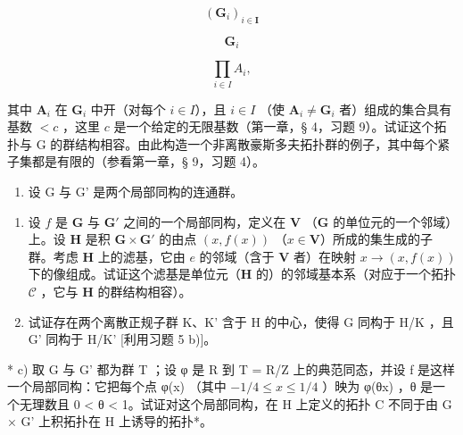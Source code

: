 \[
\left(\mathbf {G} _ {i}\right) _ {i \in \mathbf {I}}
\]

\[
\mathbf {G} _ {i}
\]

\[
\prod_ {i \in I} A _ {i},
\]

其中 \(\mathbf{A}_i\) 在 \(\mathbf{G}_i\) 中开（对每个 \(i \in I\)），且 \(i \in I\) （使 \(\mathbf{A}_i \neq \mathbf{G}_i\) 者）组成的集合具有基数 \(< c\) ，这里 \(c\) 是一个给定的无限基数（第一章，§ 4，习题 9）。试证这个拓扑与 G 的群结构相容。由此构造一个非离散豪斯多夫拓扑群的例子，其中每个紧子集都是有限的（参看第一章，§ 9，习题 4）。

\begin{enumerate}
\def\labelenumi{\arabic{enumi})}
\setcounter{enumi}{23}
\tightlist
\item
  设 G 与 G' 是两个局部同构的连通群。
\end{enumerate}

\begin{enumerate}
\def\labelenumi{\alph{enumi})}
\item
  设 \(f\) 是 \(\mathbf{G}\) 与 \(\mathbf{G}'\) 之间的一个局部同构，定义在 \(\mathbf{V}\) （\(\mathbf{G}\) 的单位元的一个邻域）上。设 \(\mathbf{H}\) 是积 \(\mathbf{G} \times \mathbf{G}'\) 的由点 \((x, f(x))\) （\(x \in \mathbf{V}\)）所成的集生成的子群。考虑 \(\mathbf{H}\) 上的滤基，它由 \(e\) 的邻域（含于 \(\mathbf{V}\) 者）在映射 \(x \to (x, f(x))\) 下的像组成。试证这个滤基是单位元（\(\mathbf{H}\) 的）的邻域基本系（对应于一个拓扑 \(\mathcal{C}\) ，它与 \(\mathbf{H}\) 的群结构相容）。
\item
  试证存在两个离散正规子群 K、K' 含于 H 的中心，使得 G 同构于 H/K ，且 G' 同构于 H/K' {[}利用习题 5 b){]}。
\end{enumerate}

* c) 取 G 与 G' 都为群 T ；设 φ 是 R 到 T = R/Z 上的典范同态，并设 f 是这样一个局部同构：它把每个点 φ(x) （其中 \(-1/4 \leqslant x \leqslant 1/4\) ）映为 φ(θx) ，θ 是一个无理数且 0 \textless{} θ \textless{} 1。试证对这个局部同构，在 H 上定义的拓扑 C 不同于由 G × G' 上积拓扑在 H 上诱导的拓扑*。

